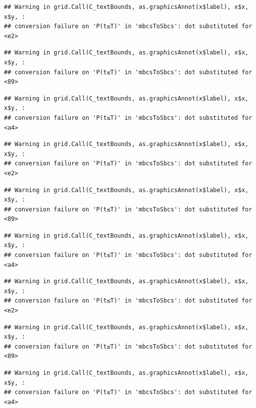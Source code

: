 \documentclass[]{book}
\begin{document}
\begin{verbatim}
## Warning in grid.Call(C_textBounds, as.graphicsAnnot(x$label), x$x, x$y, :
## conversion failure on 'P(t≤T)' in 'mbcsToSbcs': dot substituted for <e2>
\end{verbatim}

\begin{verbatim}
## Warning in grid.Call(C_textBounds, as.graphicsAnnot(x$label), x$x, x$y, :
## conversion failure on 'P(t≤T)' in 'mbcsToSbcs': dot substituted for <89>
\end{verbatim}

\begin{verbatim}
## Warning in grid.Call(C_textBounds, as.graphicsAnnot(x$label), x$x, x$y, :
## conversion failure on 'P(t≤T)' in 'mbcsToSbcs': dot substituted for <a4>
\end{verbatim}

\begin{verbatim}
## Warning in grid.Call(C_textBounds, as.graphicsAnnot(x$label), x$x, x$y, :
## conversion failure on 'P(t≤T)' in 'mbcsToSbcs': dot substituted for <e2>
\end{verbatim}

\begin{verbatim}
## Warning in grid.Call(C_textBounds, as.graphicsAnnot(x$label), x$x, x$y, :
## conversion failure on 'P(t≤T)' in 'mbcsToSbcs': dot substituted for <89>
\end{verbatim}

\begin{verbatim}
## Warning in grid.Call(C_textBounds, as.graphicsAnnot(x$label), x$x, x$y, :
## conversion failure on 'P(t≤T)' in 'mbcsToSbcs': dot substituted for <a4>
\end{verbatim}

\begin{verbatim}
## Warning in grid.Call(C_textBounds, as.graphicsAnnot(x$label), x$x, x$y, :
## conversion failure on 'P(t≤T)' in 'mbcsToSbcs': dot substituted for <e2>
\end{verbatim}

\begin{verbatim}
## Warning in grid.Call(C_textBounds, as.graphicsAnnot(x$label), x$x, x$y, :
## conversion failure on 'P(t≤T)' in 'mbcsToSbcs': dot substituted for <89>
\end{verbatim}

\begin{verbatim}
## Warning in grid.Call(C_textBounds, as.graphicsAnnot(x$label), x$x, x$y, :
## conversion failure on 'P(t≤T)' in 'mbcsToSbcs': dot substituted for <a4>
\end{verbatim}
\end{document}
